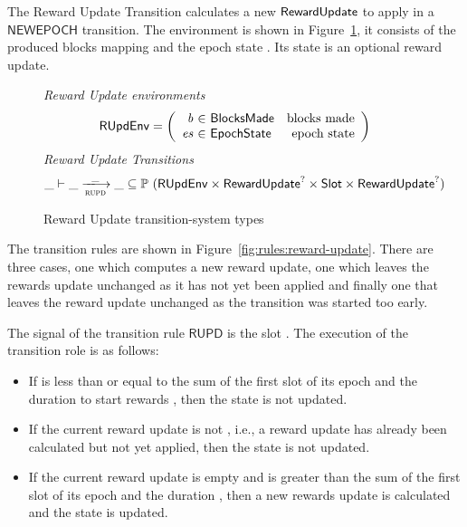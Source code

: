 The Reward Update Transition calculates a new $\mathsf{RewardUpdate}$ to apply in a
$\mathsf{NEWEPOCH}$ transition. The environment is shown in
Figure~\ref{fig:ts-types:reward-update}, it consists of the produced blocks
mapping  and the epoch state . Its state is an optional reward
update.

\begin{figure}
  \emph{Reward Update environments}
  \begin{equation*}
    \RUpdEnv =
    \left(
      \begin{array}{r@{~\in~}lr}
        \var{b} & \BlocksMade & \text{blocks made} \\
        \var{es} & \EpochState & \text{epoch state} \\
      \end{array}
    \right)
  \end{equation*}
  \emph{Reward Update Transitions}
  \begin{equation*}
    \_ \vdash \var{\_} \trans{rupd}{\_} \var{\_} \subseteq
    \powerset (\RUpdEnv \times \RewardUpdate^? \times \Slot \times \RewardUpdate^?)
  \end{equation*}
  \caption{Reward Update transition-system types}
  \label{fig:ts-types:reward-update}
\end{figure}

The transition rules are shown in Figure~\ref{fig:rules:reward-update}. There
are three cases, one which computes a new reward update, one which leaves the
rewards update unchanged as it has not yet been applied and finally one that
leaves the reward update unchanged as the transition was started too early.

The signal of the transition rule $\mathsf{RUPD}$ is the slot . The
execution of the transition role is as follows:

\begin{itemize}
\item If  is less than or equal to the sum of the first slot of its epoch
  and the duration to start rewards \StartRewards, then the state is not
  updated.
\item If the current reward update  is not \Nothing, i.e., a reward
  update has already been calculated but not yet applied, then the state is not
  updated.
\item If the current reward update  is empty and  is greater than
  the sum of the first slot of its epoch and the duration \StartRewards, then a
  new rewards update is calculated and the state is updated.
\end{itemize}

